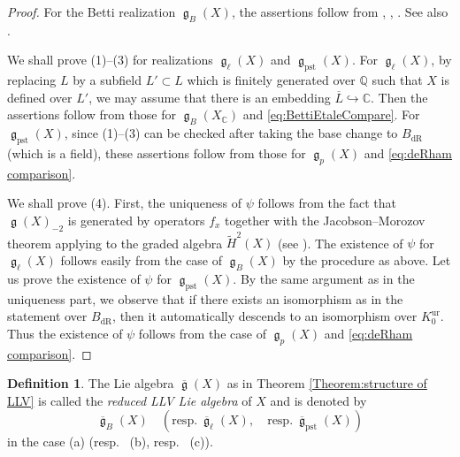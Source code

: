 \documentclass[12pt,reqno]{amsart}
\theoremstyle{definition}
\newtheorem{defn}[thm]{Definition}
\newcommand{\Q}{{\mathds Q}}
\newcommand{\C}{{\mathds C}}
\renewcommand\ge{\mathop{\mathfrak{g}}\nolimits}
\newcommand\dR{\mathop{\mathrm{dR}}}
\DeclareMathOperator{\pst}{pst}
\DeclareMathOperator{\ur}{ur}
\numberwithin{equation}{section}
\begin{document}
\begin{proof}
    For the Betti realization $\ge_B(X)$, the assertions follow from \cite{VerbitskyThesis},
    \cite{Looijenga-Lunts},
    \cite[Subsection 2.1.1]{GKLR}.
    See also \cite[Theorem 2.2]{Floccarigalois}.
    
    We shall prove (1)--(3) for realizations $\ge_\ell(X)$ and $\ge_{\pst}(X)$.
    For $\ge_\ell(X)$, by replacing $L$ by a subfield $L' \subset L$ which is finitely generated over $\Q$ such that $X$ is defined over $L'$, we may assume that there is an embedding $\overline{L} \hookrightarrow \C$.
    Then the assertions follow from those for $\ge_B(X_\C)$ and \eqref{eq:BettiEtaleCompare}.
    For $\ge_{\pst}(X)$,
    since (1)--(3) can be checked after taking the base change to $B_{\dR}$ (which is a field),
    these assertions follow from those for $\ge_p(X)$ and \eqref{eq:deRham comparison}.

    We shall prove (4).
    First, the uniqueness of $\psi$ follows from
    the fact that $\ge(X)_{-2}$ is generated by operators $f_x$ together with the Jacobson–Morozov theorem applying to the graded algebra $\widetilde{H}^2 (X)$ (see ).
    The existence of $\psi$
    for $\ge_\ell(X)$ follows easily from the case of $\ge_B(X)$ by the procedure as above.
    Let us prove the existence of $\psi$
    for $\ge_{\pst}(X)$.
    By the same argument as in the uniqueness part, we observe that if there exists
    an isomorphism as in the statement over $B_{\dR}$, then it automatically descends to an isomorphism over $K^{\ur}_0$.
    Thus the existence of $\psi$ follows from the case 
    of $\ge_p(X)$
    and \eqref{eq:deRham comparison}.
\end{proof}



\begin{defn}\label{Definition:reduced LLV}
    The Lie algebra $\overline{\ge}(X)$ as in Theorem \ref{Theorem:structure of LLV}
    is called the \emph{reduced LLV Lie algebra} of $X$ and is denoted by
    \[
    \overline{\ge}_B(X)
    \quad (\text{resp}.~ \overline{\ge}_\ell(X), \quad\text{resp}.~  \overline{\ge}_{\pst}(X))
    \]
    in the case (a) (resp.~ (b), resp.~ (c)).
\end{defn}
\end{document}
